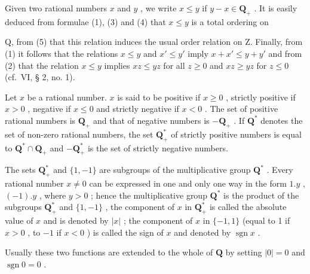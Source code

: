 Given two rational numbers \(x\) and \(y\) , we write \(x \leqslant y\) if \(y - x \in \mathbf{Q}_+\) . It is easily deduced from formulae (1), (3) and (4) that \(x \leqslant y\) is a total ordering on

Q, from (5) that this relation induces the usual order relation on Z. Finally, from (1) it follows that the relations \(x \leqslant y\) and \(x' \leqslant y'\) imply \(x + x' \leqslant y + y'\) and from (2) that the relation \(x \leqslant y\) implies \(xz \leqslant yz\) for all \(z \geqslant 0\) and \(xz \geqslant yz\) for \(z \leqslant 0\) (cf.~VI, § 2, no. 1).

Let \(x\) be a rational number. \(x\) is said to be positive if \(x \geqslant 0\) , strictly positive if \(x > 0\) , negative if \(x \leqslant 0\) and strictly negative if \(x < 0\) . The set of positive rational numbers is \(\mathbf{Q}_{+}\) and that of negative numbers is \(-\mathbf{Q}_{+}\) . If \(\mathbf{Q}^{*}\) denotes the set of non-zero rational numbers, the set \(\mathbf{Q}_{+}^{*}\) of strictly positive numbers is equal to \(\mathbf{Q}^{*} \cap \mathbf{Q}_{+}\) and \(-\mathbf{Q}_{+}^{*}\) is the set of strictly negative numbers.

The sets \(\mathbf{Q}_{+}^{*}\) and \(\{1, -1\}\) are subgroups of the multiplicative group \(\mathbf{Q}^{*}\) . Every rational number \(x \neq 0\) can be expressed in one and only one way in the form \(1.y\) , \((-1).y\) , where \(y > 0\) ; hence the multiplicative group \(\mathbf{Q}^{*}\) is the product of the subgroups \(\mathbf{Q}_{+}^{*}\) and \(\{1, -1\}\) , the component of \(x\) in \(\mathbf{Q}_{+}^{*}\) is called the absolute value of \(x\) and is denoted by \(|x|\) ; the component of \(x\) in \(\{-1, 1\}\) (equal to 1 if \(x > 0\) , to \(-1\) if \(x < 0\) ) is called the sign of \(x\) and denoted by \(\operatorname{sgn} x\) .

Usually these two functions are extended to the whole of \(\mathbf{Q}\) by setting \(|0| = 0\) and \(\operatorname{sgn} 0 = 0\) .


